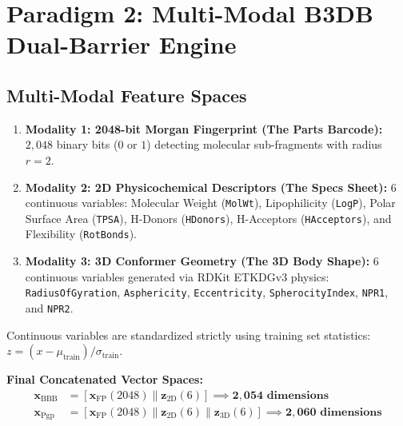\documentclass[11pt,a4paper]{article}
\begin{document}
\newpage
\section{Paradigm 2: Multi-Modal B3DB Dual-Barrier Engine}

\subsection{Multi-Modal Feature Spaces}
\begin{mathspecbox}
\begin{enumerate}[leftmargin=*]
    \item \textbf{Modality 1: 2048-bit Morgan Fingerprint (The Parts Barcode):}
    $2,048$ binary bits ($0$ or $1$) detecting molecular sub-fragments with radius $r=2$.
    \item \textbf{Modality 2: 2D Physicochemical Descriptors (The Specs Sheet):}
    $6$ continuous variables: Molecular Weight (\texttt{MolWt}), Lipophilicity (\texttt{LogP}), Polar Surface Area (\texttt{TPSA}), H-Donors (\texttt{HDonors}), H-Acceptors (\texttt{HAcceptors}), and Flexibility (\texttt{RotBonds}).
    \item \textbf{Modality 3: 3D Conformer Geometry (The 3D Body Shape):}
    $6$ continuous variables generated via RDKit ETKDGv3 physics: \texttt{RadiusOfGyration}, \texttt{Asphericity}, \texttt{Eccentricity}, \texttt{SpherocityIndex}, \texttt{NPR1}, and \texttt{NPR2}.
\end{enumerate}
Continuous variables are standardized strictly using training set statistics: $z = (x - \mu_{\text{train}}) / \sigma_{\text{train}}$.

\textbf{Final Concatenated Vector Spaces:}
\begin{align}
\mathbf{x}_{\text{BBB}} &= [\mathbf{x}_{\text{FP}} (2048) \parallel \mathbf{z}_{\text{2D}} (6)] \implies \mathbf{2,054 \text{ dimensions}} \\
\mathbf{x}_{\text{Pgp}} &= [\mathbf{x}_{\text{FP}} (2048) \parallel \mathbf{z}_{\text{2D}} (6) \parallel \mathbf{z}_{\text{3D}} (6)] \implies \mathbf{2,060 \text{ dimensions}}
\end{align}
\end{mathspecbox}
\end{document}
